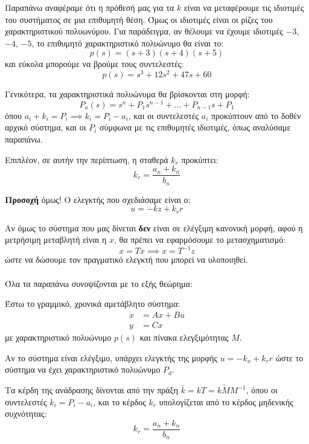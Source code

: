 \documentclass[11pt,a4paper,notitlepage,fleqn]{article}
\let\mytodo\todo
\renewcommand{\todo}[1]{\par\mytodo[inline,noline]{#1}}
\begin{document}
Παραπάνω αναφέραμε ότι η πρόθεσή μας για τα \( k \) είναι να μεταφέρουμε
τις ιδιοτιμές του συστήματος σε μια επιθυμητή θέση. Όμως οι ιδιοτιμές
είναι οι ρίζες του χαρακτηριστικού πολυωνύμου. Για παράδειγμα, αν θέλουμε
να έχουμε ιδιοτιμές \( -3 \), \( -4 \), \( -5 \), το επιθυμητό χαρακτηριστικό
πολυώνυμο θα είναι το:
\[
p(s) = (s+3)(s+4)(s+5)
\]
και εύκολα μπορούμε να βρούμε τους συντελεστές:
\[
p(s) = s^3 + 12s^2 + 47s + 60
\]

Γενικότερα, τα χαρακτηριστικά πολυώνυμα θα βρίσκονται στη μορφή:
\[
P_a(s) = s^n + P_1s^{n-1} + \dots + P_{n-1}s+P_1
\]
όπου \( a_i+k_i = P_i \implies k_i = P_i - a_i \), και οι συντελεστές
\( a_i \) προκύπτουν από το δοθέν αρχικό σύστημα, και οι \( P_i \)
σύμφωνα με τις επιθυμητές ιδιοτιμές, όπως αναλύσαμε παραπάνω.

Επιπλέον, σε αυτήν την περίπτωση, η σταθερά \( k_r \) προκύπτει:
\[
k_r = \frac{a_n+k_n}{b_n}
\]

\textbf{Προσοχή} όμως! Ο ελεγκτής που σχεδιάσαμε είναι ο:
\[
u = -kz +k_r r
\]

Αν όμως το σύστημα που μας δίνεται \textbf{δεν} είναι σε ελέγξιμη κανονική μορφή, αφού η μετρήσιμη μεταβλητή είναι η \( x \), θα πρέπει να εφαρμόσουμε
το μετασχηματισμό:
\[
x = Tx \implies x = T^{-1}z
\]
ώστε να δώσουμε τον πραγματικό ελεγκτή που μπορεί να υλοποιηθεί.

\paragraph{}
Όλα τα παραπάνω συνοψίζονται με το εξής θεώρημα:

\begin{theorem}{}{}
	Έστω το γραμμικό, χρονικά αμετάβλητο σύστημα:
	\begin{align*}
		\dot x &= Ax+Bu \\
		y &= C x
	\end{align*}
	με χαρακτηριστικό πολυώνυμο \( p(s) \) και πίνακα ελεγξιμότητας \( M \).
	
	Αν το σύστημα είναι ελέγξιμο, υπάρχει ελεγκτής της μορφής \( u = -k_x +k_r r \) ώστε το σύστημα να έχει χαρακτηριστικό πολυώνυμο \( P_d \).
	
	Τα κέρδη της ανάδρασης δίνονται από την πράξη \( \bar k = kT = k\tilde M M^{-1} \), όπου οι συντελεστές \( k_i = P_i - a_i \), και το κέρδος
	\( k_r \) υπολογίζεται από το κέρδος μηδενικής συχνότητας:
\[ \boxed{k_r = \frac{a_n+k_n}{b_n}} \]

\todo{συμπλήρωση}
\end{theorem}
\end{document}

